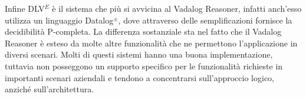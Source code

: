 Infine DLV$^E$ è il sistema che più si avvicina al Vadalog Reasoner, infatti anch'esso utilizza un linguaggio Datalog$^\pm$, dove attraverso delle semplificazioni fornisce la decidibilità P-completa. La differenza sostanziale sta nel fatto che il Vadalog Reasoner è esteso da molte altre funzionalità che ne permettono l'applicazione in diversi scenari. \newline \newline
Molti di questi sistemi hanno una buona implementazione, tuttavia non posseggono un supporto specifico per le funzionalità richieste in importanti scenari aziendali e tendono a concentrarsi sull'approccio logico, anziché sull'architettura.


